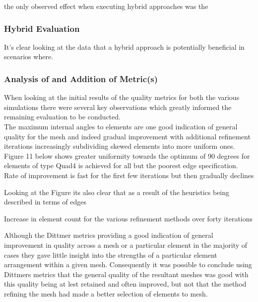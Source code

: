                                                                                                                                                       
                                                                                                                                                       
                                                                                                                                                        the only observed effect when executing hybrid approaches was the




\subsubsection{Hybrid Evaluation}
It's clear looking at the data that a hybrid approach is potentially beneficial in scenarios where.



\subsubsection{Analysis of and Addition of Metric(s)}
\noindent
When looking at the initial results of the quality metrics for both the various simulations there were several key observations which greatly informed the remaining evaluation to be conducted. \\ The maximum internal angles to elements are one good indication of general quality for the mesh and indeed gradual improvement with additional refinement iterations increasingly subdividing skewed elements into more uniform ones.
Figure 11 below shows greater uniformity towards the optimum of 90 degrees for elements of type Quad4 is achieved for all but the poorest edge specification. Rate of improvement is fast for the first few iterations but then gradually declines 

Looking at the Figure its also clear that as a result of the heuristics being described in terms of edges

Increase in element count for the various refinement methods over forty iterations

\noindent
Although the Dittmer metrics providing a good indication of general improvement in quality across a mesh or a particular element in the majority of cases they gave little insight into the strengths of a particular element arrangement within a given mesh. Consequently it was possible to conclude using Dittmers metrics that the general quality of the resultant meshes was good with this quality being at lest retained and often improved, but not that the method refining the mesh had made a better selection of elements to mesh. \\

